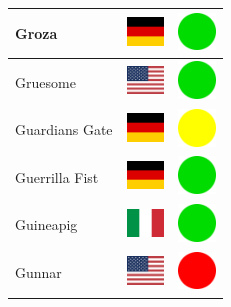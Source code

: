 \documentclass[12pt, a4paper, twoside]{report}
\begin{document}
\begin{center}
\begin{longtable}{|p{5cm}|p{2cm}|p{2cm}|}
 Groza                                                      & \includegraphics[width=1cm]{../4x3/de} &   \includegraphics[width=1cm]{../likes/y} \\ \hline
 Gruesome                                                   & \includegraphics[width=1cm]{../4x3/us} &   \includegraphics[width=1cm]{../likes/y} \\ \hline
 Guardians Gate                                             & \includegraphics[width=1cm]{../4x3/de} &   \includegraphics[width=1cm]{../likes/m} \\ \hline
 Guerrilla Fist                                             & \includegraphics[width=1cm]{../4x3/de} &   \includegraphics[width=1cm]{../likes/y} \\ \hline
 Guineapig                                                  & \includegraphics[width=1cm]{../4x3/it} &   \includegraphics[width=1cm]{../likes/y} \\ \hline
 Gunnar                                                     & \includegraphics[width=1cm]{../4x3/us} &   \includegraphics[width=1cm]{../likes/n} \\ \hline

\end{longtable}
\end{center}
\end{document}
